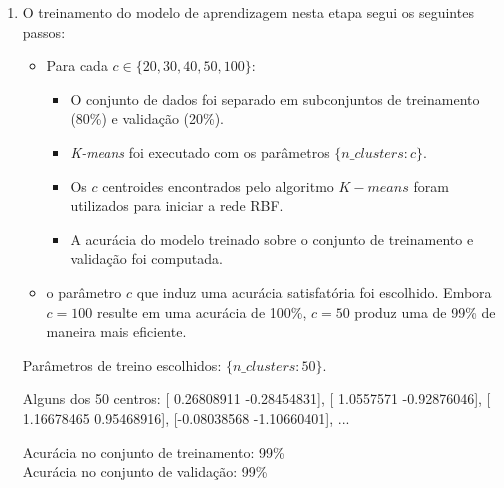 \documentclass[12pt]{report}
\begin{document}
\begin{enumerate}
	\item O treinamento do modelo de aprendizagem nesta etapa segui os seguintes passos:
	\begin{itemize}
		\item Para cada $c \in \{20, 30, 40, 50, 100\}$:
		\begin{itemize}
			\item O conjunto de dados foi separado em subconjuntos de treinamento (80\%) e
			validação (20\%).
			\item \textit{K-means} foi executado com os parâmetros $\{n\_clusters: c\}$.
			\item Os $c$ centroides encontrados pelo algoritmo $K-means$ foram utilizados
			para iniciar a rede RBF.
			\item A acurácia do modelo treinado sobre o conjunto de treinamento e validação foi computada.
		\end{itemize}
		\item o parâmetro $c$ que induz uma acurácia satisfatória foi escolhido.
		Embora $c=100$ resulte em uma acurácia de 100\%, $c=50$ produz uma de 99\% de maneira
		mais eficiente.
	\end{itemize}
	
	Parâmetros de treino escolhidos: $\{n\_clusters: 50\}$.
	
	Alguns dos 50 centros:
	[ 0.26808911 -0.28454831], [ 1.0557571  -0.92876046], [ 1.16678465  0.95468916], [-0.08038568 -1.10660401], ...
	
	Acurácia no conjunto de treinamento: 99\%\\
	Acurácia no conjunto de validação: 99\%
\end{enumerate}
\end{document}
